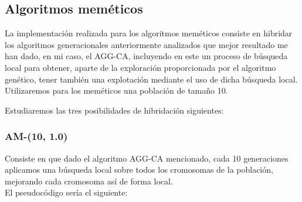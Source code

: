 \subsection{Algoritmos meméticos}
La implementación realizada para los algoritmos meméticos consiste en hibridar los algoritmos generacionales anteriormente analizados que mejor resultado me han dado, en mi caso, el AGG-CA, incluyendo en este un proceso de búsqueda local para obtener, aparte de la exploración proporcionada por el algoritmo genético, tener también una explotación mediante el uso de dicha búsqueda local.\\ 

Utilizaremos para los meméticos una población de tamaño 10.

Estudiaremos las tres posibilidades de hibridación siguientes:

\subsubsection{AM-(10, 1.0)}
Consiste en que dado el algoritmo AGG-CA mencionado, cada 10 generaciones aplicamos una búsqueda local sobre todos los cromosomas de la población, mejorando cada cromosoma así de forma local.\\ 

El pseudocódigo sería el siguiente:



